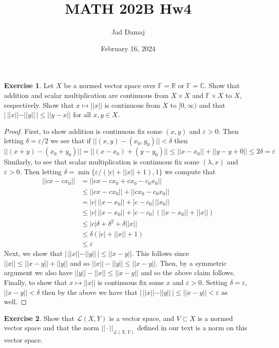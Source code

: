 \documentclass{article}
\title{MATH 202B Hw4}
\author{Jad Damaj}
\date{February 16, 2024}
\newcommand{\bR}{\mathbb{R}}
\newcommand{\bF}{\mathbb{F}}
\newcommand{\bC}{\mathbb{C}}
\newcommand{\ve}{\varepsilon}
\newcommand{\cL}{\mathcal{L}}
\theoremstyle{definition}
\newtheorem{exercise}{Exercise}
\begin{document}
\maketitle

\begin{exercise}
    Let $X$ be a normed vector space over $\bF = \bR$ or $\bF = \bC$. Show that addition and scalar multiplication are continuous from $X \times X$ and $\bF \times X$ to $X$, respectively. Show that $x \mapsto ||x||$ is continuous from $X$ to $[0, \infty)$ and that $|\, ||x||- ||y||\, | \le ||y-x||$ for all $x, y \in X$. 
\end{exercise}

\begin{proof}
    First, to show addition is continuous fix some $(x,y)$ and $\ve>0$. Then letting $\delta = \ve/2$ we see that if $||(x,y)-(x_0, y_0)|| < \delta$ then 
    \[ ||(x+y) - (x_0+y_0)|| = ||(x-x_0)+(y-y_0)|| \le ||x-x_0|| + ||y-y+0|| \le 2\delta = \ve \] 
    Similarly, to see that scalar multiplication is continuous fix some $(\lambda, x)$ and $\ve>0$. Then letting $\delta = \min\{  \ve/(|c| + ||x|| + 1), 1\}$ we compute that 
    \begin{align*}
        ||cx-cx_0|| & = ||cx - cx_0 + cx_0 - c_0x_0|| \\ 
        & \le ||cx-cx_0|| + ||cx_0 - c_0x_0|| \\ 
        & = |c|\, ||x-x_0|| + |c-c_0| \, ||x_0|| \\ 
        & \le |c| \, ||x-x_0|| + |c-c_0| \, (||x-x_0|| + ||x||) \\ 
        & \le |c| \delta + \delta^2 + \delta ||x|| \\ 
        & \le  \delta(|c| + ||x|| + 1) \\ 
        & \le \ve
    \end{align*}
    Next, we show that $|\, ||x|| - ||y||\, | \le ||x-y||$. This follows since $ ||x|| \le ||x-y|| + ||y||$ and so $ ||x||-||y|| \le ||x-y||$. Then, by a symmetric argument we also have $||y||-||x|| \le ||x-y||$ and so the above claim follows. \\ 
    Finally, to show that $x \mapsto ||x||$ is continuous fix some $x$ and $\ve > 0$. Setting $\delta = \ve$, $||x-y|| < \delta$ then by the above we have that $|\, ||x|| - ||y||\, | \le ||x-y|| < \ve$ as well. 

\end{proof}

\begin{exercise}
    Show that $\cL(X,Y)$ is a vector space, and $V \subset X$ is a normed vector space and that the norm $|| \cdot ||_{\cL(X,Y)}$ defined in our text is a norm on this vector space. 
\end{exercise}
\end{document}
